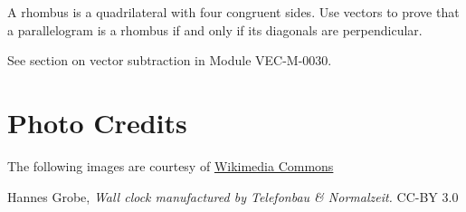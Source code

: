 \documentclass{ximera}
\begin{document}
\begin{problem}\label{prob:rhombusdot} A rhombus is a quadrilateral with four congruent sides.  Use vectors to prove that a parallelogram is a rhombus if and only if its diagonals are perpendicular.
\begin{hint}
See section on vector subtraction in Module VEC-M-0030.
\end{hint}
\end{problem}

\section*{Photo Credits}
The following images are courtesy of \href{https://commons.wikimedia.org/wiki/Main_Page}
{Wikimedia Commons}

\noindent Hannes Grobe, {\it Wall clock manufactured by Telefonbau \& Normalzeit.} CC-BY 3.0
\end{document}

